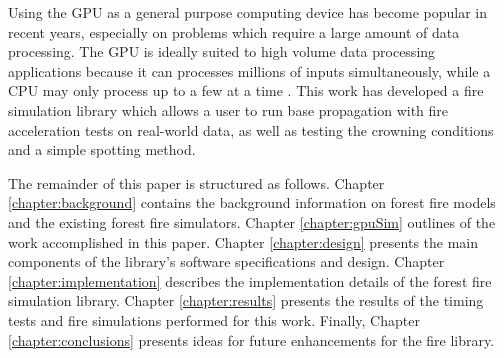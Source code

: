 Using the GPU as a general purpose computing device has become popular in recent years, especially on problems which require a large amount of data processing. The GPU is ideally suited to high volume data processing applications because it can processes millions of inputs simultaneously, while a CPU may only process up to a few at a time \cite{cudabyexample}. This work has developed a fire simulation library which allows a user to run base propagation with fire acceleration tests on real-world data, as well as testing the crowning conditions and a simple spotting method. 

The remainder of this paper is structured as follows. Chapter \ref{chapter:background} contains the background information on forest fire models and the existing forest fire simulators. Chapter \ref{chapter:gpuSim} outlines of the work accomplished in this paper. Chapter \ref{chapter:design} presents the main components of the library's software specifications and design. Chapter \ref{chapter:implementation} describes the implementation details of the forest fire simulation library. Chapter \ref{chapter:results} presents the results of the timing tests and fire simulations performed for this work. Finally, Chapter \ref{chapter:conclusions} presents ideas for future enhancements for the fire library. 